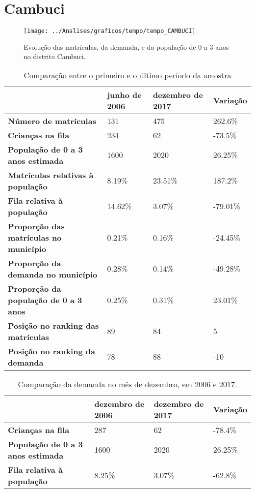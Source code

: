 \section{Cambuci}
\begin{figure}[H]
\centering
\texttt{[image: ../Analises/graficos/tempo/tempo\_CAMBUCI]}
\caption{Evolução das matrículas, da demanda, e da população de 0 a 3 anos no distrito Cambuci.}
\end{figure}
\begin{table}[H]
\begin{tabular}{|l|l|l|l|}
\hline
\textbf{}                                      & \textbf{junho de 2006}       & \textbf{dezembro de 2017}    & \textbf{Variação} \\ \hline
\textbf{Número de matrículas}                  & 131 & 475 & 262.6\% \\ \hline
\textbf{Crianças na fila}                      & 234 & 62 & -73.5\% \\ \hline
\textbf{População de 0 a 3 anos estimada}      & 1600 & 2020 & 26.25\% \\ \hline
\textbf{Matrículas relativas à população}      & 8.19\% & 23.51\% & 187.2\% \\ \hline
\textbf{Fila relativa à população}             & 14.62\% & 3.07\% & -79.01\% \\ \hline
\textbf{Proporção das matrículas no município} & 0.21\% & 0.16\% & -24.45\% \\ \hline
\textbf{Proporção da demanda no município}     & 0.28\% & 0.14\% & -49.28\% \\ \hline
\textbf{Proporção da população de 0 a 3 anos}  & 0.25\% & 0.31\% & 23.01\% \\ \hline
\textbf{Posição no ranking das matrículas}     & 89 & 84 & 5 \\ \hline
\textbf{Posição no ranking da demanda}         & 78 & 88 & -10 \\ \hline
\end{tabular}
\caption{Comparação entre o primeiro e o último período da amostra}
\end{table}
\begin{table}[H]
\begin{tabular}{|l|l|l|l|}
\hline
\textbf{}                                 & \textbf{dezembro de 2006} & \textbf{dezembro de 2017} & \textbf{Variação} \\ \hline
\textbf{Crianças na fila}                      & 287 & 62 & -78.4\% \\ \hline
\textbf{População de 0 a 3 anos estimada}      & 1600 & 2020 & 26.25\% \\ \hline
\textbf{Fila relativa à população}             & 8.25\% & 3.07\% & -62.8\% \\ \hline
\end{tabular}
\caption{Comparação da demanda no mês de dezembro, em 2006 e 2017.}
\end{table}
